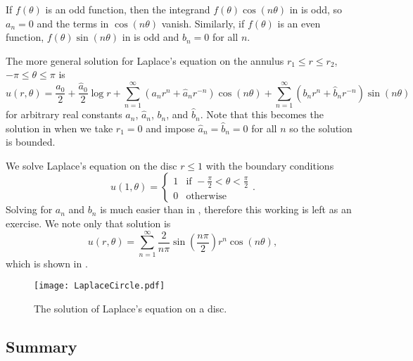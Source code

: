 \begin{enumerate}
	\begin{remark}
		If $f(\theta)$ is an odd function, then the integrand $f(\theta) \cos(n\theta)$ in  is odd, so $a_n=0$ and the terms in $\cos(n\theta)$ vanish. Similarly, if $f(\theta)$ is an even function, $f(\theta) \sin(n\theta)$ in  is odd and $b_n=0$ for all $n$.
	\end{remark}
	
	\begin{remark}
		The more general solution for Laplace's equation on the annulus $r_1 \leq r \leq r_2$, $-\pi \leq \theta \leq \pi$ is
		\begin{equation}
			u(r,\theta) = \frac{a_0}{2} + \frac{\hat{a}_0}{2}\log{r} + \sum_{n=1}^{\infty} \left(a_nr^n + \hat{a}_nr^{-n}\right)\cos(n\theta) + \sum_{n=1}^{\infty} \left(b_nr^n + \hat{b}_nr^{-n}\right)\sin(n\theta)
		\end{equation}
		for arbitrary real constants $a_n$, $\hat{a}_n$, $b_n$, and $\hat{b}_n$. Note that this becomes the solution in  when we take $r_1=0$ and impose $\hat{a}_n = \hat{b}_n = 0$ for all $n$ so the solution is bounded.
	\end{remark}
	
	\begin{eg}
		We solve Laplace's equation on the disc $r \leq 1$ with the boundary conditions
		\[
		u(1, \theta) = \begin{cases} 1 & \text{if } -\frac{\pi}{2} < \theta < \frac{\pi}{2} \\ 0 & \text{otherwise} \end{cases}.
		\]
		Solving for $a_n$ and $b_n$ is much easier than in , therefore this working is left as an exercise. We note only that solution is 
		\[
		u(r,\theta) = \sum_{n=1}^{\infty} \frac{2}{n\pi}\sin\left(\frac{n\pi}{2}\right) r^n \cos(n\theta),
		\] 
		which is shown in .
	\end{eg}
	
	\begin{figure}[!ht]
		\centering
		\texttt{[image: LaplaceCircle.pdf]}
		\caption{The solution of Laplace's equation on a disc.}
		\label{fig:laplacecircle}
	\end{figure}
\end{enumerate}

\pagebreak
\subsection{Summary}

